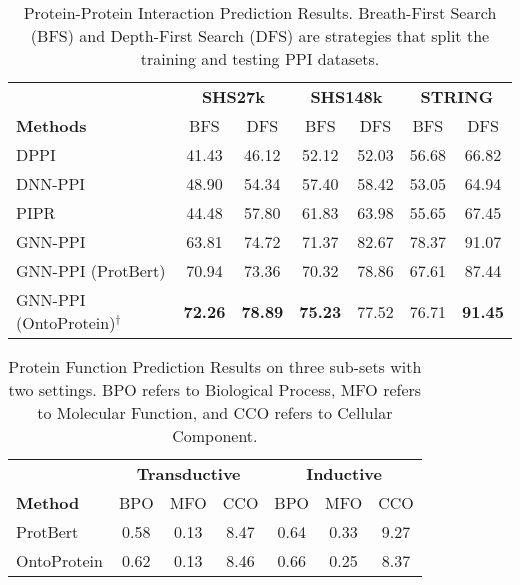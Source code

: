 \begin{table}[]
    \centering
    \begin{tabular}{l cccccc}
    \toprule
    \multicolumn{1}{l}{} &
    \multicolumn{2}{c}{\textbf{SHS27k}} &
    \multicolumn{2}{c}{\textbf{SHS148k}} &
    \multicolumn{2}{c}{\textbf{STRING}} \\
    \cmidrule(lr){2-3} \cmidrule(lr){4-5} \cmidrule(lr){6-7}
    \textbf{Methods} & BFS & DFS & BFS & DFS & BFS & DFS \\
    \midrule
    {\color{highlight} DPPI}  & {\color{highlight} 41.43} & {\color{highlight} 46.12} & {\color{highlight} 52.12} & {\color{highlight} 52.03} & {\color{highlight} 56.68} & {\color{highlight} 66.82} \\
    {\color{highlight} DNN-PPI} & {\color{highlight} 48.90} & {\color{highlight} 54.34} & {\color{highlight} 57.40} & {\color{highlight} 58.42} & {\color{highlight} 53.05}  & {\color{highlight} 64.94} \\
    PIPR & 44.48 & 57.80 & 61.83 & 63.98 & 55.65 & 67.45 \\
    GNN-PPI & 63.81 & 74.72 & 71.37 & 82.67 & 78.37 & 91.07 \\
    GNN-PPI (ProtBert) & 70.94 & 73.36 & 70.32 & 78.86 & 67.61 & 87.44 \\
    {\color{highlight} GNN-PPI (OntoProtein)$^\dagger$} & {\color{highlight}\textbf{72.26}} & {\color{highlight}\textbf{78.89}} & {\color{highlight} \textbf{75.23}} & {\color{highlight}77.52 } &  {\color{highlight} 76.71 } & {\color{highlight}\textbf{91.45}} \\
    \bottomrule
    \end{tabular}
    \caption{
    Protein-Protein Interaction Prediction Results.
    Breath-First Search (BFS) and Depth-First Search (DFS) are strategies that split the training and testing PPI datasets. 
    }
    \label{tab:ppi_result}
\end{table}

\begin{table}[]
\centering
\begin{tabular}{lcccccc}
    \toprule
    \multicolumn{1}{l}{} & \multicolumn{3}{c}{\textbf{Transductive}} & \multicolumn{3}{c}{\textbf{Inductive}}  \\
    \cmidrule(lr){2-4} \cmidrule(lr){5-7}
    \textbf{Method} & BPO & MFO & CCO & BPO & MFO & CCO \\
    \midrule
    ProtBert & 0.58 & 0.13 & 8.47 & 0.64 & 0.33 & 9.27 \\
    OntoProtein & 0.62 & 0.13 & 8.46 & 0.66 & 0.25 & 8.37 \\
    \bottomrule
\end{tabular}
\caption{
Protein Function Prediction Results on three sub-sets with two settings. 
BPO  refers to Biological Process, 
MFO refers to Molecular Function,
and CCO refers to Cellular Component. 
}
\label{result:protein_function}
\end{table}
 
